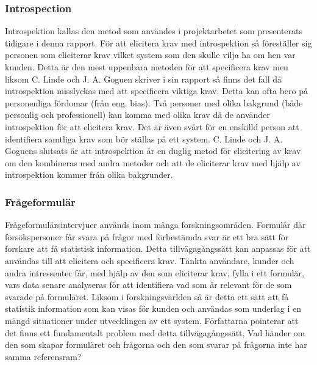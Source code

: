 \subsubsection{Introspection}
Introspektion kallas den metod som användes i projektarbetet som presenterats tidigare i denna rapport. För att elicitera krav med introspektion så föreställer sig personen som eliciterar krav vilket system som den skulle vilja ha om hen var kunden. Detta är den mest uppenbara metoden för att specificera krav men liksom C. Linde och J. A. Goguen skriver i sin rapport så finns det fall då introspektion misslyckas med att specificera viktiga krav. Detta kan ofta bero på personenliga fördomar (från eng. bias). Två personer med olika bakgrund (både personlig och professionell) kan komma med olika krav då de använder introspektion för att elicitera krav. Det är även svårt för en enskilld person att identifiera samtliga krav som bör ställas på ett system.  C. Linde och J. A. Goguens slutsats är att introspektion är en duglig metod för elicitering av krav om den kombineras med andra metoder och att de eliciterar krav med hjälp av introspektion kommer från olika bakgrunder. 

\subsubsection{Frågeformulär}
Frågeformulärsintervjuer används inom många forskningsområden. Formulär där försökspersoner får svara på frågor med förbestämda svar är ett bra sätt för forskare att få statistisk information. Detta tillvägagångssätt kan anpassas för att användas till att elicitera och specificera krav. Tänkta användare, kunder och andra intressenter får, med hjälp av den som eliciterar krav, fylla i ett formulär, vars data senare analyseras för att identifiera vad som är relevant för de som svarade på formuläret. Liksom i forskningsvärlden så är detta ett sätt att få statistik information som kan visas för kunden och användas som underlag i en mängd situationer under utvecklingen av ett system. Författarna pointerar att det finns ett fundamentalt problem med detta tillvägagångssätt, Vad händer om den som skapar formuläret och frågorna och den som svarar på frågorna inte har samma referensram?
 
